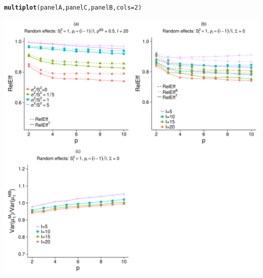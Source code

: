 \documentclass{article}\usepackage[]{graphicx}\usepackage[]{color}
\makeatletter
\def\maxwidth{ %
  \ifdim\Gin@nat@width>\linewidth
    \linewidth
  \else
    \Gin@nat@width
  \fi
}
\newcommand{\hlnum}[1]{\textcolor[rgb]{0.686,0.059,0.569}{#1}}%
\newcommand{\hlstd}[1]{\textcolor[rgb]{0.345,0.345,0.345}{#1}}%
\newcommand{\hlkwc}[1]{\textcolor[rgb]{0.333,0.667,0.333}{#1}}%
\newcommand{\hlkwd}[1]{\textcolor[rgb]{0.737,0.353,0.396}{\textbf{#1}}}%
\newenvironment{kframe}{%
 \def\at@end@of@kframe{}%
 \ifinner\ifhmode%
  \def\at@end@of@kframe{\end{minipage}}%
  \begin{minipage}{\columnwidth}%
 \fi\fi%
 \def\FrameCommand##1{\hskip\@totalleftmargin \hskip-\fboxsep
 \colorbox{shadecolor}{##1}\hskip-\fboxsep
     \hskip-\linewidth \hskip-\@totalleftmargin \hskip\columnwidth}%
 \MakeFramed {\advance\hsize-\width
   \@totalleftmargin\z@ \linewidth\hsize
   \@setminipage}}%
 {\par\unskip\endMakeFramed%
 \at@end@of@kframe}
\newenvironment{knitrout}{}{} %
\makeatother
\begin{document}
\begin{knitrout}
\color{fgcolor}\begin{kframe}
\begin{alltt}
\hlkwd{multiplot}\hlstd{(panelA, panelC, panelB,} \hlkwc{cols}\hlstd{=}\hlnum{2}\hlstd{)}
\end{alltt}


{\ttfamily\noindent\itshape\color{messagecolor}{\#\# Loading required package: grid}}\end{kframe}

{\centering \includegraphics[width=\maxwidth]{figures/Figure_S8_panels_abcd-1} 

}



\end{knitrout}
\end{document}
